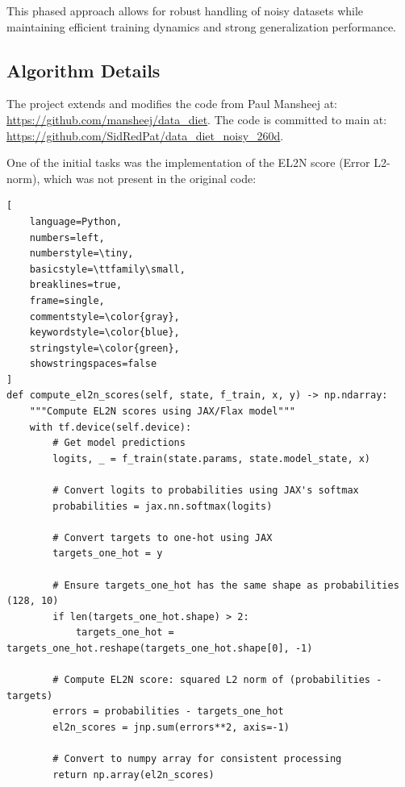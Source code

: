 \documentclass{article}
\begin{document}
This phased approach allows for robust handling of noisy datasets while maintaining efficient training dynamics and strong generalization performance.

\subsection{Algorithm Details}
The project extends and modifies the code from Paul Mansheej at: \url{https://github.com/mansheej/data_diet}. The code is committed to main at: \url{https://github.com/SidRedPat/data_diet_noisy_260d}.

One of the initial tasks was the implementation of the EL2N score (Error L2-norm), which was not present in the original code:

\begin{lstlisting}[
    language=Python,
    numbers=left,
    numberstyle=\tiny,
    basicstyle=\ttfamily\small,
    breaklines=true,
    frame=single,
    commentstyle=\color{gray},
    keywordstyle=\color{blue},
    stringstyle=\color{green},
    showstringspaces=false
]
def compute_el2n_scores(self, state, f_train, x, y) -> np.ndarray:
    """Compute EL2N scores using JAX/Flax model"""
    with tf.device(self.device):
        # Get model predictions
        logits, _ = f_train(state.params, state.model_state, x)

        # Convert logits to probabilities using JAX's softmax
        probabilities = jax.nn.softmax(logits)

        # Convert targets to one-hot using JAX
        targets_one_hot = y

        # Ensure targets_one_hot has the same shape as probabilities (128, 10)
        if len(targets_one_hot.shape) > 2:
            targets_one_hot = targets_one_hot.reshape(targets_one_hot.shape[0], -1)

        # Compute EL2N score: squared L2 norm of (probabilities - targets)
        errors = probabilities - targets_one_hot
        el2n_scores = jnp.sum(errors**2, axis=-1)

        # Convert to numpy array for consistent processing
        return np.array(el2n_scores)
\end{lstlisting}
\end{document}
